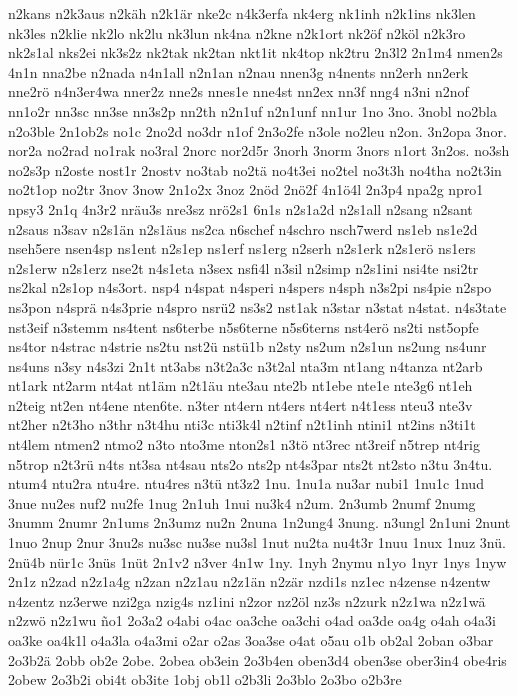 {n2kans
n2k3aus
n2käh
n2k1är
nke2c
n4k3erfa
nk4erg
nk1inh
n2k1ins
nk3len
nk3les
n2klie
nk2lo
nk2lu
nk3lun
nk4na
n2kne
n2k1ort
nk2öf
n2köl
n2k3ro
nk2s1al
nks2ei
nk3s2z
nk2tak
nk2tan
nkt1it
nk4top
nk2tru
2n3l2
2n1m4
nmen2s
4n1n
nna2be
n2nada
n4n1all
n2n1an
n2nau
nnen3g
n4nents
nn2erh
nn2erk
nne2rö
n4n3er4wa
nner2z
nne2s
nnes1e
nne4st
nn2ex
nn3f
nng4
n3ni
n2nof
nn1o2r
nn3sc
nn3se
nn3s2p
nn2th
n2n1uf
n2n1unf
nn1ur
1no
3no.
3nobl
no2bla
n2o3ble
2n1ob2s
no1c
2no2d
no3dr
n1of
2n3o2fe
n3ole
no2leu
n2on.
3n2opa
3nor.
nor2a
no2rad
no1rak
no3ral
2norc
nor2d5r
3norh
3norm
3nors
n1ort
3n2os.
no3sh
no2s3p
n2oste
nost1r
2nostv
no3tab
no2tä
no4t3ei
no2tel
no3t3h
no4tha
no2t3in
no2t1op
no2tr
3nov
3now
2n1o2x
3noz
2nöd
2nö2f
4n1ö4l
2n3p4
npa2g
npro1
npsy3
2n1q
4n3r2
nräu3s
nre3sz
nrö2s1
6n1s
n2s1a2d
n2s1all
n2sang
n2sant
n2saus
n3sav
n2s1än
n2s1äus
ns2ca
n6schef
n4schro
nsch7werd
ns1eb
ns1e2d
nseh5ere
nsen4sp
ns1ent
n2s1ep
ns1erf
ns1erg
n2serh
n2s1erk
n2s1erö
ns1ers
n2s1erw
n2s1erz
nse2t
n4s1eta
n3sex
nsfi4l
n3sil
n2simp
n2s1ini
nsi4te
nsi2tr
ns2kal
n2s1op
n4s3ort.
nsp4
n4spat
n4speri
n4spers
n4sph
n3s2pi
ns4pie
n2spo
ns3pon
n4sprä
n4s3prie
n4spro
nsrü2
ns3s2
nst1ak
n3star
n3stat
n4stat.
n4s3tate
nst3eif
n3stemm
ns4tent
ns6terbe
n5s6terne
n5s6terns
nst4erö
ns2ti
nst5opfe
ns4tor
n4strac
n4strie
ns2tu
nst2ü
nstü1b
n2sty
ns2um
n2s1un
ns2ung
ns4unr
ns4uns
n3sy
n4s3zi
2n1t
nt3abs
n3t2a3c
n3t2al
nta3m
nt1ang
n4tanza
nt2arb
nt1ark
nt2arm
nt4at
nt1äm
n2t1äu
nte3au
nte2b
nt1ebe
nte1e
nte3g6
nt1eh
n2teig
nt2en
nt4ene
nten6te.
n3ter
nt4ern
nt4ers
nt4ert
n4t1ess
nteu3
nte3v
nt2her
n2t3ho
n3thr
n3t4hu
nti3c
nti3k4l
n2tinf
n2t1inh
ntini1
nt2ins
n3ti1t
nt4lem
ntmen2
ntmo2
n3to
nto3me
nton2s1
n3tö
nt3rec
nt3reif
n5trep
nt4rig
n5trop
n2t3rü
n4ts
nt3sa
nt4sau
nts2o
nts2p
nt4s3par
nts2t
nt2sto
n3tu
3n4tu.
ntum4
ntu2ra
ntu4re.
ntu4res
n3tü
nt3z2
1nu.
1nu1a
nu3ar
nubi1
1nu1c
1nud
3nue
nu2es
nuf2
nu2fe
1nug
2n1uh
1nui
nu3k4
n2um.
2n3umb
2numf
2numg
3numm
2numr
2n1ums
2n3umz
nu2n
2nuna
1n2ung4
3nung.
n3ungl
2n1uni
2nunt
1nuo
2nup
2nur
3nu2s
nu3sc
nu3se
nu3sl
1nut
nu2ta
nu4t3r
1nuu
1nux
1nuz
3nü.
2nü4b
nür1c
3nüs
1nüt
2n1v2
n3ver
4n1w
1ny.
1nyh
2nymu
n1yo
1nyr
1nys
1nyw
2n1z
n2zad
n2z1a4g
n2zan
n2z1au
n2z1än
n2zär
nzdi1s
nz1ec
n4zense
n4zentw
n4zentz
nz3erwe
nzi2ga
nzig4s
nz1ini
n2zor
nz2öl
nz3s
n2zurk
n2z1wa
n2z1wä
n2zwö
n2z1wu
ño1
2o3a2
o4abi
o4ac
oa3che
oa3chi
o4ad
oa3de
oa4g
o4ah
o4a3i
oa3ke
oa4k1l
o4a3la
o4a3mi
o2ar
o2as
3oa3se
o4at
o5au
o1b
ob2al
2oban
o3bar
2o3b2ä
2obb
ob2e
2obe.
2obea
ob3ein
2o3b4en
oben3d4
oben3se
ober3in4
obe4ris
2obew
2o3b2i
obi4t
ob3ite
1obj
ob1l
o2b3li
2o3blo
2o3bo
o2b3re
}

